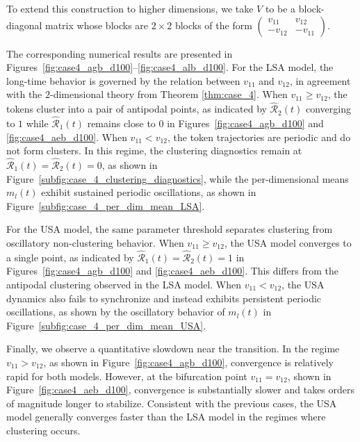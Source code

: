 \documentclass[10pt]{article}
\theoremstyle{definition}
\theoremstyle{definition}
\numberwithin{equation}{section}
\newcommand{\CR}{\mathcal{R}}
\begin{document}
To extend this construction to higher dimensions, we take $V$ to be a block-diagonal matrix whose blocks are $2\times 2$ blocks of the form
$\left(\begin{smallmatrix} v_{11} & v_{12} \\ -v_{12} & -v_{11} \end{smallmatrix}\right)$.

The corresponding numerical results are presented in Figures~\ref{fig:case4_agb_d100}--\ref{fig:case4_alb_d100}.
For the LSA model, the long-time behavior is governed by the relation between $v_{11}$ and $v_{12}$, in agreement with the $2$-dimensional theory from Theorem \ref{thm:case_4}. 
When $v_{11} \geq v_{12}$, the tokens cluster into a pair of antipodal points, as indicated
by $\widehat{\CR}_2(t)$ converging to $1$ while $\widehat{\CR}_1(t)$ remains close to $0$ in Figures~\ref{fig:case4_agb_d100} and \ref{fig:case4_aeb_d100}. 
When $v_{11} < v_{12}$, the token trajectories are periodic and do not form clusters. 
In this regime, the clustering diagnostics remain at $\widehat{\CR}_1(t) = \widehat{\CR}_2(t) = 0$, as shown in Figure~\ref{subfig:case_4_clustering_diagnostics}, while the per-dimensional means $m_l(t)$ exhibit sustained periodic oscillations, as shown in Figure~\ref{subfig:case_4_per_dim_mean_LSA}.
    
For the USA model, the same parameter threshold separates clustering from oscillatory non-clustering behavior. 
When $v_{11} \geq v_{12}$, the USA model converges to a single point, as indicated by $\widehat{\CR}_1(t) = \widehat{\CR}_2(t) = 1$ in Figures~\ref{fig:case4_agb_d100} and \ref{fig:case4_aeb_d100}.
This differs from the antipodal clustering observed in the LSA model. 
When $v_{11} < v_{12}$, the USA dynamics also fails to synchronize and instead exhibits persistent periodic oscillations, as shown by the oscillatory behavior of $m_l(t)$ in Figure~\ref{subfig:case_4_per_dim_mean_USA}.

Finally, we observe a quantitative slowdown near the transition.
In the regime $v_{11} > v_{12}$, as shown in Figure~\ref{fig:case4_agb_d100}, convergence is relatively rapid for both models. 
However, at the bifurcation point $v_{11} = v_{12}$, shown in Figure~\ref{fig:case4_aeb_d100}, convergence is substantially slower and takes orders of magnitude longer to stabilize. 
Consistent with the previous cases, the USA model generally converges faster than the LSA model in the regimes where clustering occurs.
\end{document}
